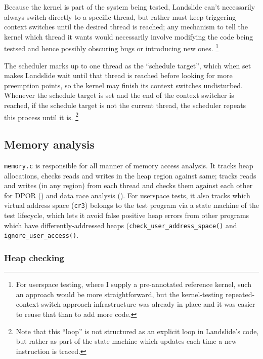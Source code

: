 Because the kernel is part of the system being tested, Landslide can't necessarily always switch directly to a specific thread,
but rather must keep triggering context switches until the desired thread is reached;
any mechanism to tell the kernel which thread it wants would necessarily involve modifying the code being testsed
and hence possibly obscuring bugs or introducing new ones.%
\footnote{For userspace testing, where I supply a pre-annotated reference kernel,
such an approach would be more straightforward,
but the kernel-testing repeated-context-switch approach infrastructure was already in place
and it was easier to reuse that than to add more code.}

The scheduler marks up to one thread as the ``schedule target'',
which when set makes Landslide wait until that thread is reached before looking for more preemption points,
so the kernel may finish its context switches undisturbed.
Whenever the schedule target is set and the end of the context switcher is reached,
if the schedule target is not the current thread,
the scheduler repeats this process until it is.%
\footnote{Note that this ``loop'' is not structured as an explicit loop in Landslide's code,
but rather as part of the state machine which updates each time a new instruction is traced.}


\subsection{Memory analysis}
\label{sec:landslide-memory}

{\tt memory.c} is responsible for all manner of memory access analysis.
It tracks heap allocations, checks reads and writes in the heap region against same;
tracks reads and writes (in any region) from each thread
and checks them against each other
for DPOR (\sect{\ref{sec:landslide-dpor}})
and data race analysis (\sect{\ref{sec:landslide-datarace}}).
For userspace tests, it also tracks which virtual address space ({\tt cr3}) belongs to the test program
via a state machine of the test lifecycle,
which lets it avoid false positive heap errors from other programs which have differently-addressed heaps
({\tt check\_user\_address\_space()} and {\tt ignore\_user\_access()}.

\subsubsection{Heap checking}

